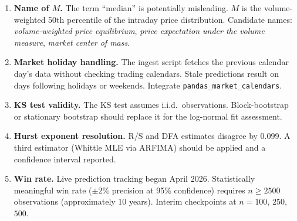 \documentclass[11pt]{article}
\begin{document}
\begin{enumerate}
    \item \textbf{Name of $M$.} The term ``median'' is potentially misleading. $M$ is the volume-weighted 50th percentile of the intraday price distribution. Candidate names: \textit{volume-weighted price equilibrium}, \textit{price expectation under the volume measure}, \textit{market center of mass}.

    \item \textbf{Market holiday handling.} The ingest script fetches the previous calendar day's data without checking trading calendars. Stale predictions result on days following holidays or weekends. Integrate \texttt{pandas\_market\_calendars}.

    \item \textbf{KS test validity.} The KS test assumes i.i.d.\ observations. Block-bootstrap or stationary bootstrap should replace it for the log-normal fit assessment.

    \item \textbf{Hurst exponent resolution.} R/S and DFA estimates disagree by 0.099. A third estimator (Whittle MLE via ARFIMA) should be applied and a confidence interval reported.

    \item \textbf{Win rate.} Live prediction tracking began April 2026. Statistically meaningful win rate ($\pm 2\%$ precision at 95\% confidence) requires $n \geq 2500$ observations (approximately 10 years). Interim checkpoints at $n = 100$, $250$, $500$.
\end{enumerate}
\end{document}
